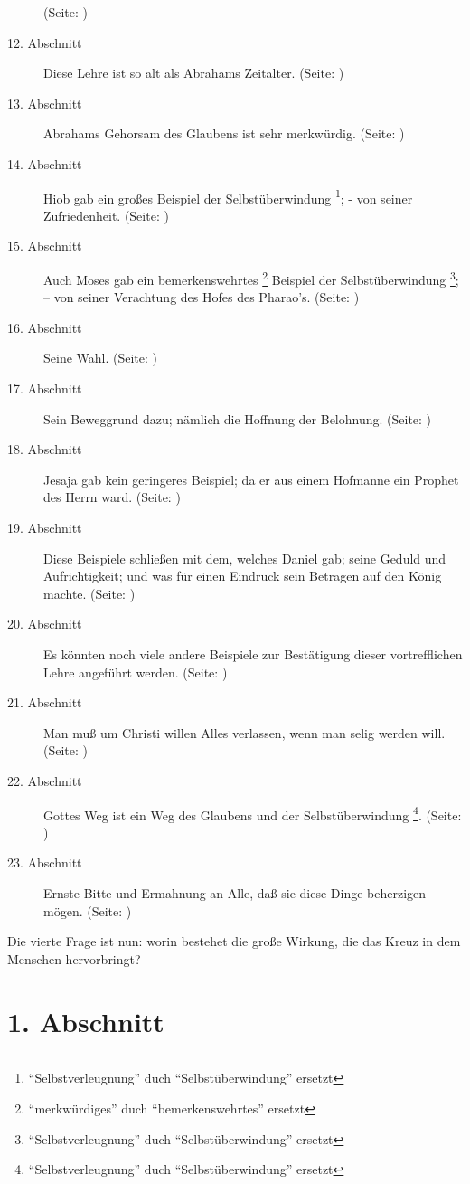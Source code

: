 \begin{description}
(Seite: \pageref{kap4_ab11})
\item[12. Abschnitt] Diese Lehre ist so alt als Abrahams Zeitalter. (Seite:
\pageref{kap4_ab12})
\item[13. Abschnitt] Abrahams Gehorsam des Glaubens ist sehr merkwürdig. (Seite:
\pageref{kap4_ab13})
\item[14. Abschnitt] Hiob gab ein großes Beispiel der Selbstüberwindung
\footnote{"`Selbstverleugnung"' duch "`Selbstüberwindung"' ersetzt}; - von
seiner Zufriedenheit. (Seite: \pageref{kap4_ab14})
\item[15. Abschnitt] Auch Moses gab ein bemerkenswehrtes
\footnote{"`merkwürdiges"' duch "`bemerkenswehrtes"' ersetzt} Beispiel der
Selbstüberwindung \footnote{"`Selbstverleugnung"' duch "`Selbstüberwindung"'
ersetzt}; -- von seiner Verachtung des Hofes des Pharao's. (Seite:
\pageref{kap4_ab15})
\item[16. Abschnitt] Seine Wahl. (Seite: \pageref{kap4_ab16})
\item[17. Abschnitt] Sein Beweggrund dazu; nämlich die Hoffnung der Belohnung.
(Seite: \pageref{kap4_ab17})
\item[18. Abschnitt] Jesaja gab kein geringeres Beispiel; da er aus einem
Hofmanne ein Prophet des Herrn ward. (Seite: \pageref{kap4_ab18})
\item[19. Abschnitt] Diese Beispiele schließen mit dem, welches Daniel gab;
seine Geduld und Aufrichtigkeit; und was für einen Eindruck sein Betragen auf
den König machte. (Seite: \pageref{kap4_ab19})
\item[20. Abschnitt] Es könnten noch viele andere Beispiele zur Bestätigung
dieser vortrefflichen Lehre angeführt werden. (Seite: \pageref{kap4_ab20})
\item[21. Abschnitt] Man muß um Christi willen Alles verlassen, wenn man selig
werden will. (Seite: \pageref{kap4_ab21})
\item[22. Abschnitt] Gottes Weg ist ein Weg des Glaubens und der
Selbstüberwindung \footnote{"`Selbstverleugnung"' duch "`Selbstüberwindung"'
ersetzt}. (Seite: \pageref{kap4_ab22})
\item[23. Abschnitt] Ernste Bitte und Ermahnung an Alle, daß sie diese Dinge
beherzigen mögen. (Seite: \pageref{kap4_ab23})
\end{description}
\normalsize


Die vierte Frage ist nun: worin bestehet die große Wirkung, die das Kreuz in dem
Menschen hervorbringt?

\section{1. Abschnitt} \label{kap4_ab1}

